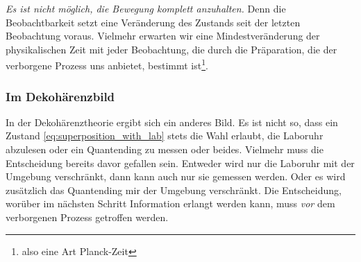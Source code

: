 \documentclass[12pt]{article}
\begin{document}
\emph{Es ist nicht möglich, die Bewegung komplett anzuhalten.} Denn die Beobachtbarkeit setzt eine Veränderung des Zustands seit der letzten Beobachtung voraus. Vielmehr erwarten wir eine Mindestveränderung der physikalischen Zeit mit jeder Beobachtung, die durch die Präparation, die der verborgene Prozess uns anbietet, bestimmt ist\footnote{also eine Art Planck-Zeit}.

\subsubsection{Im Dekohärenzbild} 

In der Dekohärenztheorie ergibt sich ein anderes Bild. Es ist nicht so, dass ein Zustand \eqref{eq:superposition_with_lab} stets die Wahl erlaubt, die Laboruhr abzulesen oder ein Quantending zu messen oder beides. Vielmehr muss die Entscheidung bereits davor gefallen sein. Entweder wird nur die Laboruhr mit der Umgebung verschränkt, dann kann auch nur sie gemessen werden. Oder es wird zusätzlich das Quantending mir der Umgebung verschränkt. Die Entscheidung, worüber im nächsten Schritt Information erlangt werden kann, muss \emph{vor} dem verborgenen Prozess getroffen werden.
\end{document}
